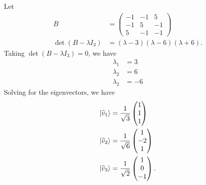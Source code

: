 \documentclass[10pt]{mypackage}
\begin{document}
\begin{example}
  \renewcommand{\arraystretch}{1.5}
  Let
  \begin{align*}
    B &= \begin{pmatrix}-1 & -1 & 5 \\ -1 & 5 & -1 \\ 5 & -1 & -1\end{pmatrix}\\
    \det\left(B - \lambda I_{3}\right) &= \left(\lambda - 3\right)\left(\lambda - 6\right)\left(\lambda + 6\right).
  \end{align*}
  Taking $\det\left(B - \lambda I_{3}\right) = 0$, we have
  \begin{align*}
    \lambda_1 &= 3\\
    \lambda_2 &= 6\\
    \lambda_2 &= -6
  \end{align*}
  Solving for the eigenvectors, we have
  \begin{align*}
    \ket{\widehat{v}_1} &= \frac{1}{\sqrt{3}}\begin{pmatrix}1\\1\\1\end{pmatrix}\\
    \ket{\widehat{v}_2} &= \frac{1}{\sqrt{6}} \begin{pmatrix}1\\-2\\1\end{pmatrix}\\
    \ket{\widehat{v}_3} &= \frac{1}{\sqrt{2}}\begin{pmatrix}1\\0\\-1\end{pmatrix}.
  \end{align*}
\end{example}
\end{document}
